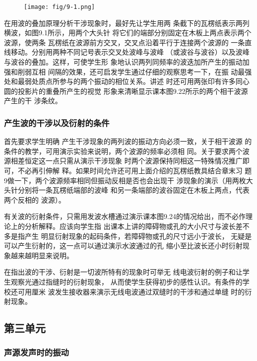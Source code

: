 \begin{figure}[htp]
    \centering
\texttt{[image: fig/9-1.png]}
    \caption{}
\end{figure}

在用波的叠加原理分析干涉现象时，最好先让学生用两
条截下的瓦楞纸表示两列横波，如图9.1所示，用两个大头针
将它们的端部分别固定在木板上两点表示两个波源，使两条
瓦楞纸在波源前方交叉，交叉点沿着平行于连接两个波源的
一条直线移动。分别用两种不同记号表示交叉处波峰与波峰
（或波谷与波谷）以及波峰与波谷的叠加。这样，可使学生形
象地认识两列同频率的波迭加所产生的振动加强和削弱互相
间隔的效果，还可启发学生通过仔细的观察思考一下，在振
动最强处和最弱处质点所参与的两个振动的相位关系。讲述
时还可用两张印有许多同心圆的投影片的重叠所产生的视觉
形象来清晰显示课本图9.22所示的两个相干波源产生的干
涉条纹。

\subsubsection{产生波的干涉以及衍射的条件}

首先要求学生明确
产生干涉现象的两列波的振动方向必须一致，关于相干波源
的条件的教学，可用演示实验来说明，两个波源的频率必须相
同。关于要求两个波源相差恒定这一点只需从演示干涉现象
时两个波源保持同相这一特殊情况推广即可，不必再引伸解
释。如果时间允许还可用上面介绍的瓦楞纸教具结合章末习
题9做一下，两个波源频率相同但振动反相是否也会出现干
涉现象的演示（用两枚大头针分别将一条瓦楞纸端部的波峰
和另一条端部的波谷固定在木板上两点，代表两个反相的
波源）。

有关波的衍射条件，只需用发波水槽通过演示课本图9.24的情况给出，而不必作理论上的分析解释。应该向学生指
出课本上讲的障碍物或孔的大小尺寸与波长差不多是指产生
明显衍射现象的起码条件，若障碍物或孔的尺寸远小于波长，
无疑是可以产生衍射的，这一点可以通过演示水波通过的孔
缩小至比波长还小时衍射现象越来越明显来说明。

在指出波的干涉、衍射是一切波所特有的现象时可举无
线电波衍射的例子和让学生观察光通过指缝时的衍射现象，
从而使学生获得初步的感性认识。有条件的学校还可用厘米
波发生接收器来演示无线电波通过双缝时的干涉和通过单缝
时的衍射现象。

\subsection{第三单元}
\subsubsection{声源发声时的振动}

